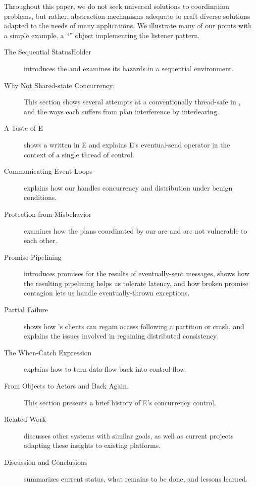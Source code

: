 \documentclass{llncs}
\begin{document}
Throughout this paper, we do not seek universal solutions to coordination
problems, but rather, abstraction mechanisms adequate to craft diverse
solutions adapted to the needs of many applications. We illustrate
many of our points with a simple example, a ``''
object implementing the listener pattern.
%
\begin{description}
\item[The Sequential StatusHolder] introduces the 
and examines its hazards in a sequential environment.

\item[Why Not Shared-state Concurrency.] This section shows several
attempts at a conventionally thread-safe  in
, and the ways each suffers from plan interference by
interleaving.

\item[A Taste of E] shows a  written in E and explains
E's eventual-send operator in the context of a single thread of
control.

\item[Communicating Event-Loops] explains how our 
handles concurrency and distribution under benign conditions.

\item[Protection from Misbehavior] examines how the plans coordinated
by our  are and are not vulnerable to each other.

\item[Promise Pipelining] introduces promises for the results of
eventually-sent messages, shows how the resulting pipelining helps us
tolerate latency, and how broken promise contagion lets us handle
eventually-thrown exceptions.

\item[Partial Failure] shows how 's clients can
regain access following a partition or crash, and explains the issues
involved in regaining distributed consistency.

\item[The When-Catch Expression] explains how to turn data-flow back
into control-flow.

\item[From Objects to Actors and Back Again.] This section presents a
brief history of E's concurrency control.

\item[Related Work] discusses other systems with similar goals, as
well as current projects adapting these insights to existing
platforms.

\item[Discussion and Conclusions] summarizes current status, what
remains to be done, and lessons learned. 

\end{description}
\end{document}

